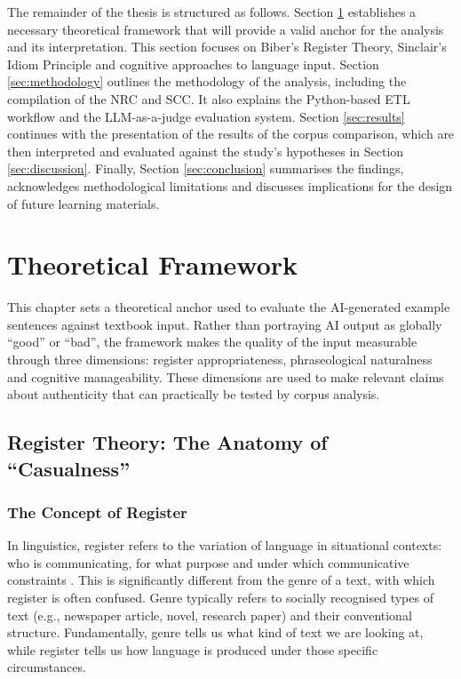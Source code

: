 \documentclass[11pt,a4paper]{article}
\begin{document}
The remainder of the thesis is structured as follows. Section \ref{sec:theoretical-framework} establishes a necessary theoretical framework that will provide a valid anchor for the analysis and its interpretation. This section focuses on Biber's Register Theory, Sinclair's Idiom Principle and cognitive approaches to language input. Section \ref{sec:methodology} outlines the methodology of the analysis, including the compilation of the NRC and SCC. It also explains the Python-based ETL workflow and the LLM-as-a-judge evaluation system. Section \ref{sec:results} continues with the presentation of the results of the corpus comparison, which are then interpreted and evaluated against the study's hypotheses in Section \ref{sec:discussion}. Finally, Section \ref{sec:conclusion} summarises the findings, acknowledges methodological limitations and discusses implications for the design of future learning materials.

\section{Theoretical Framework}\label{sec:theoretical-framework}

This chapter sets a theoretical anchor used to evaluate the AI-generated example sentences against textbook input. Rather than portraying AI output as globally ``good'' or ``bad'', the framework makes the quality of the input measurable through three dimensions: register appropriateness, phraseological naturalness and cognitive manageability. These dimensions are used to make relevant claims about authenticity that can practically be tested by corpus analysis.

\subsection{Register Theory: The Anatomy of ``Casualness''}\label{subsec:register-theory}

\subsubsection{The Concept of Register}\label{subsubsec:concept-register}

In linguistics, register refers to the variation of language in situational contexts: who is communicating, for what purpose and under which communicative constraints \parencite[15]{biberGrammarSpokenWritten2021a}. This is significantly different from the genre of a text, with which register is often confused. Genre typically refers to socially recognised types of text (e.g., newspaper article, novel, research paper) and their conventional structure. Fundamentally, genre tells us what kind of text we are looking at, while register tells us how language is produced under those specific circumstances.
\end{document}
